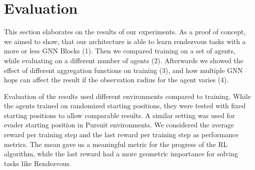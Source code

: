 
\chapter{Evaluation}
\label{ch:Evaluation}

This section elaborates on the results of our experiments. As a proof of concept, we aimed to show, that our architecture is able to learn rendezvous tasks with a more or less GNN Blocks (1). Then we compared training on a set of agents, while evaluating on a different number of agents (2). Afterwards we showed the effect of different aggregation functions on training (3), and how multiple GNN hops can affect the result if the observation radius for the agent varies (4). 
\par

Evaluation of the results used different environments compared to training. While the agents trained on randomized starting positions, they were tested with fixed starting positions to allow comparable results. A similar setting was used for evader starting position in Pursuit environments. We considered the average reward per training step and the last reward per training step as performance metrics. The mean gave us a meaningful metric for the progress of the RL algorithm, while the last reward had a more geometric importance for solving tasks like Rendezvous.  \par

